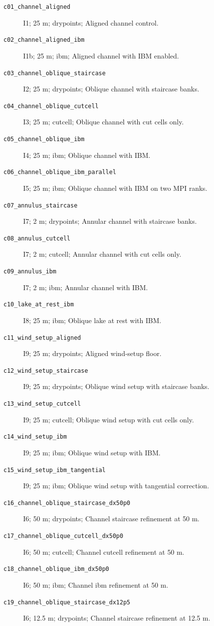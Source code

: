 \begin{description}
\item[\texttt{c01\_channel\_aligned}] I1; 25 m; drypoints; Aligned channel control.
\item[\texttt{c02\_channel\_aligned\_ibm}] I1b; 25 m; ibm; Aligned channel with IBM enabled.
\item[\texttt{c03\_channel\_oblique\_staircase}] I2; 25 m; drypoints; Oblique channel with staircase banks.
\item[\texttt{c04\_channel\_oblique\_cutcell}] I3; 25 m; cutcell; Oblique channel with cut cells only.
\item[\texttt{c05\_channel\_oblique\_ibm}] I4; 25 m; ibm; Oblique channel with IBM.
\item[\texttt{c06\_channel\_oblique\_ibm\_parallel}] I5; 25 m; ibm; Oblique channel with IBM on two MPI ranks.
\item[\texttt{c07\_annulus\_staircase}] I7; 2 m; drypoints; Annular channel with staircase banks.
\item[\texttt{c08\_annulus\_cutcell}] I7; 2 m; cutcell; Annular channel with cut cells only.
\item[\texttt{c09\_annulus\_ibm}] I7; 2 m; ibm; Annular channel with IBM.
\item[\texttt{c10\_lake\_at\_rest\_ibm}] I8; 25 m; ibm; Oblique lake at rest with IBM.
\item[\texttt{c11\_wind\_setup\_aligned}] I9; 25 m; drypoints; Aligned wind-setup floor.
\item[\texttt{c12\_wind\_setup\_staircase}] I9; 25 m; drypoints; Oblique wind setup with staircase banks.
\item[\texttt{c13\_wind\_setup\_cutcell}] I9; 25 m; cutcell; Oblique wind setup with cut cells only.
\item[\texttt{c14\_wind\_setup\_ibm}] I9; 25 m; ibm; Oblique wind setup with IBM.
\item[\texttt{c15\_wind\_setup\_ibm\_tangential}] I9; 25 m; ibm; Oblique wind setup with tangential correction.
\item[\texttt{c16\_channel\_oblique\_staircase\_dx50p0}] I6; 50 m; drypoints; Channel staircase refinement at 50 m.
\item[\texttt{c17\_channel\_oblique\_cutcell\_dx50p0}] I6; 50 m; cutcell; Channel cutcell refinement at 50 m.
\item[\texttt{c18\_channel\_oblique\_ibm\_dx50p0}] I6; 50 m; ibm; Channel ibm refinement at 50 m.
\item[\texttt{c19\_channel\_oblique\_staircase\_dx12p5}] I6; 12.5 m; drypoints; Channel staircase refinement at 12.5 m.

\end{description}
